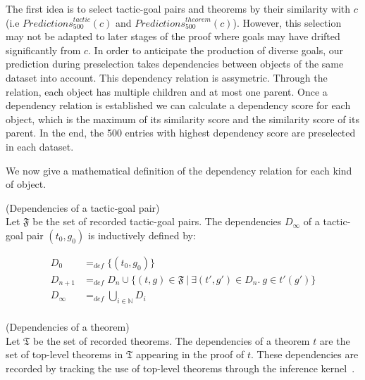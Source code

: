 \documentclass[runningheads,a4paper,draft]{svjour3}
\begin{document}

The first idea is to select tactic-goal pairs and theorems by their similarity
with $c$ (i.e $\mathit{Predictions}^{\mathit{tactic}}_{500} (c)$ and
$\mathit{Predictions}^{\mathit{theorem}}_{500} (c)$).
However, this selection may not be adapted to later stages of
the proof where goals may have drifted significantly from $c$. In order to
anticipate the production of diverse goals, our prediction during preselection
takes dependencies between objects of the same dataset into account.
This dependency relation is assymetric. Through the relation, each object has
multiple children and at most one parent.
Once a dependency relation is established we can calculate a dependency score
for each object, which is the maximum of its similarity score
and the similarity score of its parent. In the end, the 500 entries with
highest dependency score are preselected in each dataset.

We now give a mathematical definition of the dependency relation for each kind
of object.

\begin{definition}(Dependencies of a tactic-goal pair)\\
Let $\mathfrak{F}$ be the set of recorded tactic-goal pairs.
The dependencies $D_\infty$ of a tactic-goal pair $(t_0,g_0)$ is
inductively defined by:

\begin{align*}
D_0 &=_{def} \lbrace (t_0,g_0) \rbrace \\
D_{n+1} &=_{def} D_n \cup \lbrace (t,g)\in \mathfrak{F}\  |\ \exists
(t',g') \in D_n.\ g \in t'(g') \rbrace  \\
D_\infty &=_{def} \bigcup_{i \in \mathbb{N}} D_i\\
\end{align*}
\end{definition}


\begin{definition}(Dependencies of a theorem)\\
Let $\mathfrak{T}$ be the set of recorded theorems.
The dependencies of a theorem $t$ are the set of top-level theorems in
$\mathfrak{T}$ appearing in the proof of $t$. These dependencies are
recorded by tracking the use of top-level theorems through the inference
kernel~\cite{tgck-cpp15}.
\end{definition}
\end{document}
